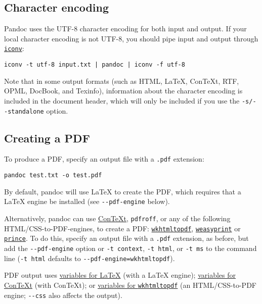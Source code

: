\documentclass[
  12pt,
  a4paper,
]{article}
\begin{document}
\hypertarget{character-encoding}{%
\subsection{Character encoding}\label{character-encoding}}

Pandoc uses the UTF-8 character encoding for both input and output. If your local character
encoding is not UTF-8, you should pipe input and output through
\href{http://www.gnu.org/software/libiconv/}{\texttt{iconv}}:

\begin{verbatim}
iconv -t utf-8 input.txt | pandoc | iconv -f utf-8
\end{verbatim}

Note that in some output formats (such as HTML, LaTeX, ConTeXt, RTF, OPML, DocBook, and Texinfo),
information about the character encoding is included in the document header, which will only be
included if you use the \texttt{-s/-\/-standalone} option.

\hypertarget{creating-a-pdf}{%
\subsection{Creating a PDF}\label{creating-a-pdf}}

To produce a PDF, specify an output file with a \texttt{.pdf} extension:

\begin{verbatim}
pandoc test.txt -o test.pdf
\end{verbatim}

By default, pandoc will use LaTeX to create the PDF, which requires that a LaTeX engine be
installed (see \texttt{-\/-pdf-engine} below).

Alternatively, pandoc can use \href{http://www.contextgarden.net/}{ConTeXt}, \texttt{pdfroff}, or
any of the following HTML/CSS-to-PDF-engines, to create a PDF:
\href{https://wkhtmltopdf.org}{\texttt{wkhtmltopdf}},
\href{http://weasyprint.org}{\texttt{weasyprint}} or
\href{https://www.princexml.com/}{\texttt{prince}}. To do this, specify an output file with a
\texttt{.pdf} extension, as before, but add the \texttt{-\/-pdf-engine} option or
\texttt{-t\ context}, \texttt{-t\ html}, or \texttt{-t\ ms} to the command line (\texttt{-t\ html}
defaults to \texttt{-\/-pdf-engine=wkhtmltopdf}).

PDF output uses \protect\hyperlink{variables-for-latex}{variables for LaTeX} (with a LaTeX
engine); \protect\hyperlink{variables-for-context}{variables for ConTeXt} (with ConTeXt); or
\protect\hyperlink{variables-for-wkhtmltopdf}{variables for \texttt{wkhtmltopdf}} (an
HTML/CSS-to-PDF engine; \texttt{-\/-css} also affects the output).
\end{document}
